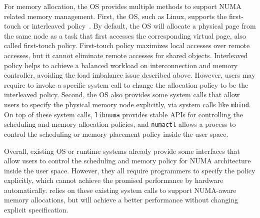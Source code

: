 For memory allocation, the OS provides multiple methods to support NUMA related memory management. First, the OS, such as Linux, supports the first-touch or interleaved policy~\cite{lameter2013numa, diener2015locality}. By default, the OS will allocate a physical page from the same node as a task that first accesses the corresponding virtual page, also called  first-touch policy. First-touch policy maximizes local accesses over remote accesses, but it cannot eliminate remote accesses for shared objects. Interleaved policy helps to achieve a balanced workload  on interconnection and memory controller, avoiding the load imbalance issue described above. However, users may require to invoke a specific system call to change the allocation policy to be the interleaved policy. Second, the OS also provides some system calls that allow users to specify the physical memory node explicitly, via system calls like \texttt{mbind}. On top of these system calls, \texttt{libnuma} provides stable APIs for controlling the scheduling and memory allocation policies, and \texttt{numactl} allows a process to control the scheduling or memory placement policy inside the user space. 

Overall, existing OS or runtime systems already provide some interfaces that allow users to control the scheduling and memory policy for NUMA architecture inside the user space. However, they all require programmers to specify the policy explicitly, which cannot achieve the promised performance by hardware automatically. \NM{} relies on these existing system calls to support NUMA-aware memory allocations, but will achieve a better performance without changing explicit specification. 







 